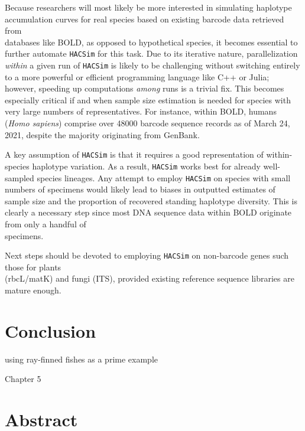 Because researchers will most likely be more interested in simulating haplotype \\ accumulation curves for real species based on existing barcode data retrieved from \\ databases like BOLD, as opposed to hypothetical species, it becomes essential to further automate {\tt HACSim} for this task. Due to its iterative nature, parallelization \textit{within} a given run of {\tt HACSim} is likely to be challenging without switching entirely to a more powerful or efficient programming language like C++ or Julia; however, speeding up computations \textit{among} runs is a trivial fix. This becomes especially critical if and when sample size estimation is needed for species with very large numbers of representatives. For instance, within BOLD, humans (\textit{Homo sapiens}) comprise over 48000 barcode sequence records as of March 24, 2021, despite the majority originating from GenBank. 

A key assumption of {\tt HACSim} is that it requires a good representation of within-species haplotype variation. As a result, {\tt HACSim} works best for already well-sampled species lineages. Any attempt to employ {\tt HACSim} on species with small numbers of specimens would likely lead to biases in outputted estimates of sample size and the proportion of recovered standing haplotype diversity.  This is clearly a necessary step since most DNA sequence data within BOLD originate from only a handful of \\ specimens.


Next steps should be devoted to employing {\tt HACSim} on non-barcode genes such those for plants \\ (rbcL/matK) and fungi (ITS), provided existing reference sequence libraries are mature enough.

\section{Conclusion}

using ray-finned fishes as a prime example


Chapter 5

\section{Abstract}

